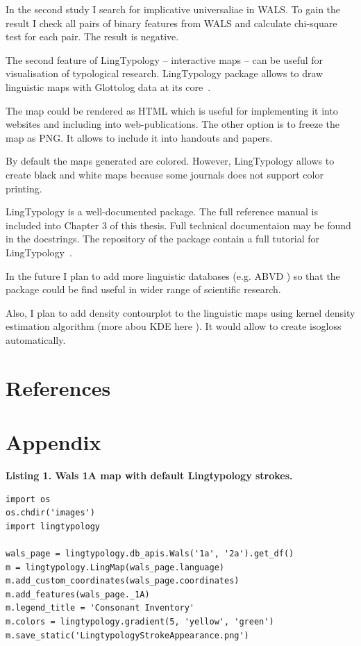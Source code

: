 \documentclass[a4paper,12pt]{article}
\begin{document}
In the second study I search for implicative universaliae in WALS. To gain the result I check all pairs of binary features from WALS and calculate chi-square test for each pair. The result is negative.

The second feature of LingTypology -- interactive maps -- can be useful for visualisation of typological research. LingTypology package allows to draw linguistic maps with Glottolog data at its core~\parencite{HaraldHammarstrom2019}.

The map could be rendered as HTML which is useful for implementing it into websites and including into web-publications. The other option is to freeze the map as PNG. It allows to include it into handouts and papers.

By default the maps generated are colored. However, LingTypology allows to create black and white maps because some journals does not support color printing.

LingTypology is a well-documented package. The full reference manual is included into Chapter 3 of this thesis. Full technical documentaion may be found in the docstrings. The repository of the package contain a full tutorial for LingTypology~\parencite{Govnov2019}.

In the future I plan to add more linguistic databases (e.g. ABVD \parencite{abvd}) so that the package could be find useful in wider range of scientific research.

Also, I plan to add density contourplot to the linguistic maps using kernel density estimation algorithm (more abou KDE here \parencite{kde}). It would allow to create isogloss automatically.

\newpage

\section{References}
\printbibliography[type=misc, title=Programming Tools]
\printbibliography[type=manual, title=Documentation]
\printbibliography[type=online, title=Online Recources]
\printbibliography[type=article, title=Articles]
\printbibliography[filter=other, title=Other]
\newpage
\section{Appendix}

\textbf{Listing 1. Wals 1A map with default Lingtypology strokes.}
\begin{lstlisting}
import os
os.chdir('images')
import lingtypology

wals_page = lingtypology.db_apis.Wals('1a', '2a').get_df()
m = lingtypology.LingMap(wals_page.language)
m.add_custom_coordinates(wals_page.coordinates)
m.add_features(wals_page._1A)
m.legend_title = 'Consonant Inventory'
m.colors = lingtypology.gradient(5, 'yellow', 'green')
m.save_static('LingtypologyStrokeAppearance.png')
\end{lstlisting}
\bigskip
\end{document}
